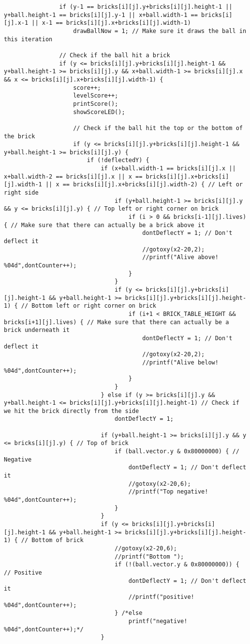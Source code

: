 \begin{lstlisting}
				if (y-1 == bricks[i][j].y+bricks[i][j].height-1 || y+ball.height-1 == bricks[i][j].y-1 || x+ball.width-1 == bricks[i][j].x-1 || x-1 == bricks[i][j].x+bricks[i][j].width-1)
					drawBallNow = 1; // Make sure it draws the ball in this iteration

				// Check if the ball hit a brick
				if (y <= bricks[i][j].y+bricks[i][j].height-1 && y+ball.height-1 >= bricks[i][j].y && x+ball.width-1 >= bricks[i][j].x && x <= bricks[i][j].x+bricks[i][j].width-1) {
					score++;
					levelScore++;
					printScore();
					showScoreLED();
					
					// Check if the ball hit the top or the bottom of the brick
					if (y <= bricks[i][j].y+bricks[i][j].height-1 && y+ball.height-1 >= bricks[i][j].y) {												
			  		    if (!deflectedY) {
							if (x+ball.width-1 == bricks[i][j].x || x+ball.width-2 == bricks[i][j].x || x == bricks[i][j].x+bricks[i][j].width-1 || x == bricks[i][j].x+bricks[i][j].width-2) { // Left or right side
								if (y+ball.height-1 >= bricks[i][j].y && y <= bricks[i][j].y) { // Top left or right corner on brick
									if (i > 0 && bricks[i-1][j].lives) { // Make sure that there can actually be a brick above it
										dontDeflectY = 1; // Don't deflect it
										//gotoxy(x2-20,2);
										//printf("Alive above! %04d",dontCounter++);
									}
								}
								if (y <= bricks[i][j].y+bricks[i][j].height-1 && y+ball.height-1 >= bricks[i][j].y+bricks[i][j].height-1) { // Bottom left or right corner on brick
									if (i+1 < BRICK_TABLE_HEIGHT && bricks[i+1][j].lives) { // Make sure that there can actually be a brick underneath it
										dontDeflectY = 1; // Don't deflect it
										//gotoxy(x2-20,2);
										//printf("Alive below! %04d",dontCounter++);
									}
								}
							} else if (y >= bricks[i][j].y && y+ball.height-1 <= bricks[i][j].y+bricks[i][j].height-1) // Check if we hit the brick directly from the side
								dontDeflectY = 1;

							if (y+ball.height-1 >= bricks[i][j].y && y <= bricks[i][j].y) { // Top of brick
								if (ball.vector.y & 0x80000000) { // Negative
									dontDeflectY = 1; // Don't deflect it
									//gotoxy(x2-20,6);
									//printf("Top negative! %04d",dontCounter++);
								}
							}
							if (y <= bricks[i][j].y+bricks[i][j].height-1 && y+ball.height-1 >= bricks[i][j].y+bricks[i][j].height-1) { // Bottom of brick
								//gotoxy(x2-20,6);
								//printf("Bottom ");
								if (!(ball.vector.y & 0x80000000)) { // Positive
									dontDeflectY = 1; // Don't deflect it
									//printf("positive! %04d",dontCounter++);
								} /*else
									printf("negative! %04d",dontCounter++);*/
							}
							

\end{lstlisting}
